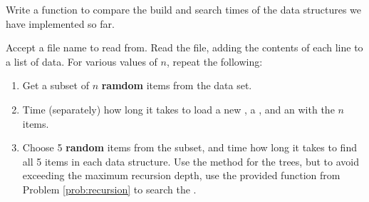 \begin{problem} %
Write a function to compare the build and search times of the data structures we have implemented so far.

Accept a file name to read from.
Read the file, adding the contents of each line to a list of data.
For various values of $n$, repeat the following:
%
\begin{enumerate}
\item Get a subset of $n$ \textbf{ramdom} items from the data set.
\item Time (separately) how long it takes to load a new , a , and an  with the $n$ items.
\item Choose 5 \textbf{random} items from the subset, and time how long it takes to find all 5 items in each data structure.
Use the  method for the trees, but to avoid exceeding the maximum recursion depth, use the provided  function from Problem \ref{prob:recursion} to search the .
\end{enumerate}


\end{problem}
